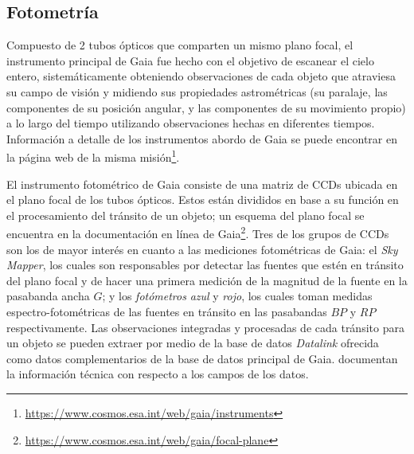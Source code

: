 \subsection{Fotometría}

Compuesto de 2 tubos ópticos que comparten un mismo plano focal, el instrumento
principal de Gaia fue hecho con el objetivo de escanear el cielo entero,
sistemáticamente obteniendo observaciones de cada objeto que atraviesa su campo
de visión y midiendo sus propiedades astrométricas (su paralaje, las componentes
de su posición angular, y las componentes de su movimiento propio) a lo largo
del tiempo utilizando observaciones hechas en diferentes tiempos. Información a
detalle de los instrumentos abordo de Gaia se puede encontrar en la página web
de la misma
misión\footnote{\url{https://www.cosmos.esa.int/web/gaia/instruments}}. 

El instrumento fotométrico de Gaia consiste de una matriz de CCDs ubicada en el
plano focal de los tubos ópticos. Estos están divididos en base a su función en
el procesamiento del tránsito de un objeto; un esquema del plano focal se
encuentra en la documentación en línea de
Gaia\footnote{\url{https://www.cosmos.esa.int/web/gaia/focal-plane}}. Tres de
los grupos de CCDs son los de mayor interés en cuanto a las mediciones
fotométricas de Gaia: el \textit{Sky Mapper}, los cuales son responsables por
detectar las fuentes que estén en tránsito del plano focal y de hacer una
primera medición de la magnitud de la fuente en la pasabanda ancha $G$; y los
\textit{fotómetros} \textit{azul} y \textit{rojo}, los cuales toman medidas
espectro-fotométricas de las fuentes en tránsito en las pasabandas $BP$ y $RP$
respectivamente. Las observaciones integradas y procesadas de cada tránsito para
un objeto se pueden extraer por medio de la base de datos \textit{Datalink}
ofrecida como datos complementarios de la base de datos principal de Gaia.
 documentan la información
técnica con respecto a los campos de los datos.

